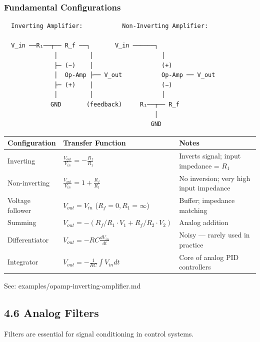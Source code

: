 \documentclass[11pt,a4paper]{book}
\begin{document}
\subsubsection{Fundamental Configurations}

\begin{lstlisting}
  Inverting Amplifier:           Non-Inverting Amplifier:
  
  V_in ──R₁──┬── R_f ──┐       V_in ──────┐
              │         │                   │
              ├─ (−)    │                   (+)
              │  Op-Amp ├── V_out           Op-Amp ── V_out
              ├─ (+)    │                   (−)
              │         │                   │
             GND       (feedback)     R₁──┬── R_f
                                          │
                                         GND
\end{lstlisting}

\begin{center}
\begin{tabular}{|l|l|l|}
\hline
Configuration & Transfer Function & Notes \\
\hline
Inverting & $\frac{V_{out}}{V_{in}} = -\frac{R_f}{R_1}$ & Inverts signal; input impedance = $R_1$ \\
Non-inverting & $\frac{V_{out}}{V_{in}} = 1 + \frac{R_f}{R_1}$ & No inversion; very high input impedance \\
Voltage follower & $V_{out} = V_{in}$ ($R_f = 0, R_1 = \infty$) & Buffer; impedance matching \\
Summing & $V_{out} = -(R_f/R_1 \cdot V_1 + R_f/R_2 \cdot V_2)$ & Analog addition \\
Differentiator & $V_{out} = -RC \frac{dV_{in}}{dt}$ & Noisy — rarely used in practice \\
Integrator & $V_{out} = -\frac{1}{RC}\int V_{in} dt$ & Core of analog PID controllers \\
\hline
\end{tabular}
\end{center}

See: examples/opamp-inverting-amplifier.md

\medskip\noindent\hrulefill\medskip

\subsection{4.6 Analog Filters}

Filters are essential for signal conditioning in control systems.
\end{document}
